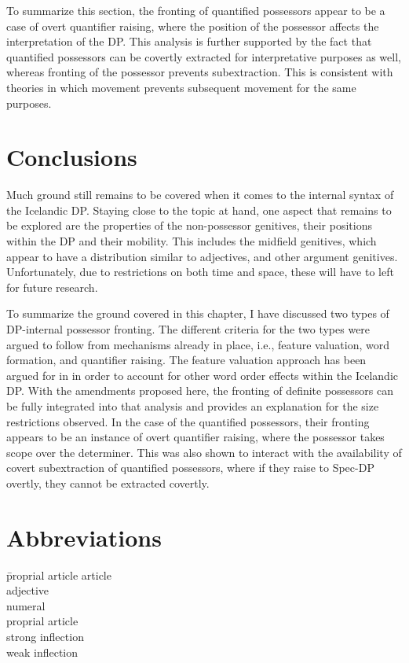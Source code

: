 \documentclass[output=paper,colorlinks,citecolor=brown,
]{langscibook}
\begin{document}
To summarize this section, the fronting of quantified possessors appear to be a case of overt quantifier raising, where the position of the possessor affects the interpretation of the DP. This analysis is further supported by the fact that quantified possessors can be covertly extracted for interpretative purposes as well, whereas fronting of the possessor prevents subextraction. This is consistent with theories in which movement prevents subsequent movement for the same purposes.




\section{Conclusions}\label{sec:hardarson:4}

Much ground still remains to be covered when it comes to the internal syntax of the Icelandic DP. Staying close to the topic at hand, one aspect that remains to be explored are the properties of the non-possessor genitives, their positions within the DP and their mobility. This includes the midfield genitives, which appear to have a distribution similar to adjectives, and other argument genitives. Unfortunately, due to restrictions on both time and space, these will have to left for future research.

To summarize the ground covered in this chapter, I have discussed two types of DP-internal possessor fronting. The different criteria for the two types were argued to follow from mechanisms already in place, i.e., feature valuation, word formation, and quantifier raising. The feature valuation approach has been argued for in \citet{Hardarson:2016wd} in order to account for other word order effects within the Icelandic DP. With the amendments proposed here, the fronting of definite possessors can be fully integrated into that analysis and provides an explanation for the size restrictions observed. In the case of the quantified possessors, their fronting appears to be an instance of overt quantifier raising, where the possessor takes scope over the determiner. This was also shown to interact with the availability of covert subextraction of quantified possessors, where if they raise to Spec-DP overtly, they cannot be extracted covertly.




\section*{Abbreviations}
\begin{multicols}{3}
\begin{tabbing}
\hardProp\hspace{1ex}\= proprial article \kill
\hardArt \> article \\
\hardAdj \> adjective \\
\hardNum \> numeral   \\
\hardProp \> proprial article \\
\hardStr \> strong inflection \\
\hardWk \> weak inflection
\end{tabbing}
\end{multicols}
\end{document}

